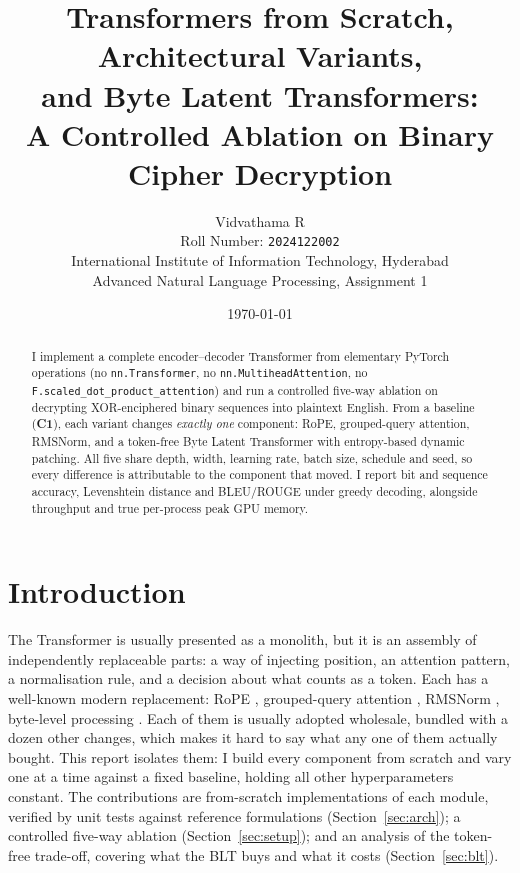 \documentclass[12pt,a4paper]{article}
\title{\vspace{-2.5em}\textbf{Transformers from Scratch, Architectural Variants,\\
and Byte Latent Transformers:\\
A Controlled Ablation on Binary Cipher Decryption}\vspace{-0.5em}}
\author{%
Vidvathama R\\
\small Roll Number: \texttt{2024122002}\\
\small International Institute of Information Technology, Hyderabad\\
\small Advanced Natural Language Processing, Assignment 1
}
\date{\vspace{-1em}\small\today}
\newcommand{\cfg}[1]{\textbf{#1}}
\begin{document}
\maketitle
\vspace{-2em}

\begin{abstract}
\noindent
I implement a complete encoder--decoder Transformer from elementary PyTorch
operations (no \texttt{nn.Transformer}, no \texttt{nn.MultiheadAttention}, no
\texttt{F.scaled\_dot\_product\_attention}) and run a controlled five-way
ablation on decrypting XOR-enciphered binary sequences into plaintext English.
From a baseline (\cfg{C1}), each variant changes \emph{exactly one} component:
RoPE, grouped-query attention, RMSNorm, and a token-free Byte Latent Transformer
with entropy-based dynamic patching. All five share depth, width, learning rate,
batch size, schedule and seed, so every difference is attributable to the
component that moved. I report bit and sequence accuracy, Levenshtein distance
and BLEU/ROUGE under greedy decoding, alongside throughput and true per-process
peak GPU memory.
\end{abstract}

\section{Introduction}
\label{sec:intro}

The Transformer \citep{vaswani2017attention} is usually presented as a monolith,
but it is an assembly of independently replaceable parts: a way of injecting
position, an attention pattern, a normalisation rule, and a decision about what
counts as a token. Each has a well-known modern replacement: RoPE
\citep{su2021roformer}, grouped-query attention \citep{ainslie2023gqa}, RMSNorm
\citep{zhang2019rmsnorm}, byte-level processing \citep{pagnoni2024blt}. Each of
them is usually adopted wholesale, bundled with a dozen other changes, which makes it
hard to say what any one of them actually bought. This report isolates them: I
build every component from scratch and vary one at a time against a fixed
baseline, holding all other hyperparameters constant. The contributions are
from-scratch implementations of each module, verified by unit tests against
reference formulations (Section~\ref{sec:arch}); a controlled five-way ablation
(Section~\ref{sec:setup}); and an analysis of the token-free trade-off, covering
what the BLT buys and what it costs (Section~\ref{sec:blt}).
\end{document}
